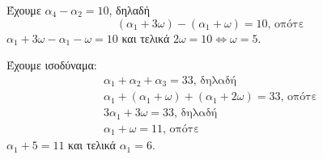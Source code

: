 
\begin{alist}
\item Έχουμε $\alpha_4 - \alpha_2 = 10$, δηλαδή
\[(\alpha_1 + 3\omega) - (\alpha_1 + \omega) = 10\text{, οπότε}\]
$\alpha_1 + 3\omega - \alpha_1 - \omega = 10$ και τελικά $2\omega = 10 \Leftrightarrow \omega = 5$.

\item Έχουμε ισοδύναμα:
\begin{gather*}
\alpha_1 + \alpha_2 + \alpha_3 = 33\text{, δηλαδή} \\
\alpha_1 + (\alpha_1 + \omega) + (\alpha_1 + 2\omega) = 33\text{, οπότε} \\
3\alpha_1 + 3\omega = 33\text{, δηλαδή} \\
\alpha_1 + \omega = 11\text{, οπότε}
\end{gather*}
$\alpha_1 + 5 = 11$ και τελικά $\alpha_1 = 6$.
\end{alist}

